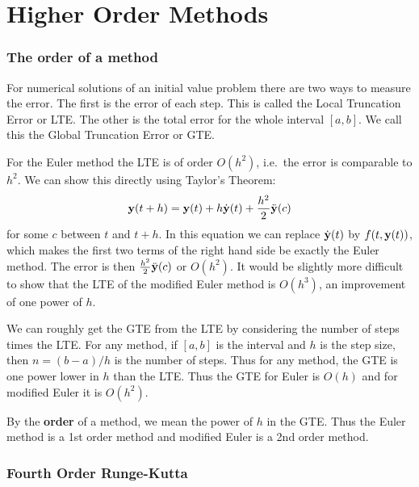 \chapter{Higher Order Methods}


\subsection*{The order of a method}

For numerical solutions of an initial value problem
there are two ways to measure the error. The first
is the error of each step. This is called the Local
Truncation Error or LTE. The other is the total error
for the whole interval $[a,b]$. We call this the
Global Truncation Error or GTE.

For the Euler method the LTE is of order $O(h^2)$, i.e.~the
error is comparable to $h^2$. We can show this directly
using Taylor's Theorem:
$$
    \mathbf{y}(t+h) = \mathbf{y}(t) + h \dot{\mathbf{y}}(t) + \frac{h^2}{2} \ddot{\mathbf{y}}(c)
$$
for some $c$ between $t$ and $t+h$. In this equation we can replace
$\dot{\mathbf{y}}(t)$ by $f(t,\mathbf{y}(t))$, which makes the first two terms
of the right hand side be exactly the Euler method. The error
is then $\frac{h^2}{2} \ddot{\mathbf{y}}(c)$ or $O(h^2)$.
It would be slightly more difficult to show that the LTE of the
modified Euler method is $O(h^3)$, an improvement of one power of $h$.

We can roughly get the GTE from the LTE by considering the number of steps
times the LTE. For any method, if $[a,b]$ is the interval and $h$ is
the step size, then $n = (b-a)/h$ is the number of steps. Thus for any method,
the GTE is one power lower in $h$ than the LTE. Thus the GTE for Euler
is $O(h)$ and for modified Euler it is $O(h^2)$.

By the {\bf order} of a method, we mean the power of $h$ in the GTE. Thus
the Euler method is a 1st order method and modified Euler is a 2nd order
method.


\subsection*{Fourth Order Runge-Kutta}

